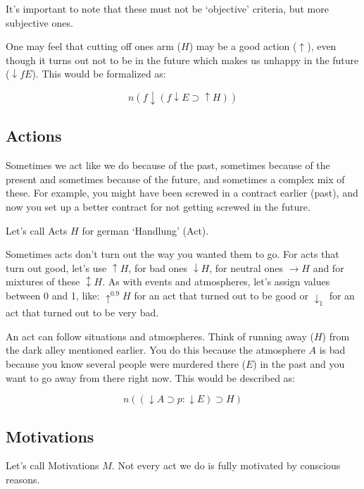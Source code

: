 \documentclass{scrartcl}
\begin{document}
It's important to note that these must not be `objective' criteria, but more subjective ones. 

One may feel that cutting off ones arm ($H$)
may be a good action ($\uparrow$), even though it turns out not to be in the future  which makes us unhappy in the future ($\downarrow f E$).
This would be formalized as:

\begin{equation} n \left(
		f \downarrow \left( f\downarrow E \supset \uparrow H \right)
	\right)
\end{equation}

\subsection{Actions}

Sometimes we act like we do because of the past, sometimes because of the present and sometimes because of the future, and sometimes
a complex mix of these. For example, you might have been screwed in a contract earlier (past), and now you set up a better contract
for not getting screwed in the future. 

Let's call Acts $H$ for german `Handlung' (Act).

Sometimes acts don't turn out the way you wanted them to go. For acts that turn out good, let's use $\uparrow H$, for bad ones 
$\downarrow H$, for neutral ones $\rightarrow H$ and for mixtures of these $\updownarrow H$. As with events and atmospheres,
let's assign values between 0 and 1, like: $\uparrow^{0.9} H$ for an act that turned out to be good or $\downarrow_1$ for an
act that turned out to be very bad.

An act can follow situations and atmospheres. Think of running away ($H$) from the dark alley mentioned earlier. You do this because the
atmosphere $A$ is bad because you know several people were murdered there ($E$) in the past and you want to go away from there right now. This would be
described as:

\begin{equation}
	n \left(\left(
		\downarrow A \supset p: \downarrow E
	\right) \supset H\right)
\end{equation}

\subsection{Motivations}

Let's call Motivations $M$. Not every act we do is fully motivated by conscious reasons. 
\end{document}
